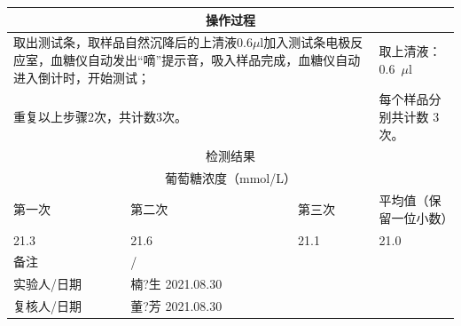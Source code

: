 \documentclass[UTF8,10pt,a4paper,fontset=fandol]{ctexart}
\newcommand{\fieldvalue}[1]{#1}
\newcommand{\handwritten}[1]{#1}
\begin{document}
\begin{enumerate}
\begin{center}
\begin{tabular}{|p{}|p{}|p{}|p{}|}
\hline
\multicolumn{4}{|c|}{操作过程} \\
\hline
\multicolumn{3}{|p{0.69\textwidth}|}{取出测试条，取样品自然沉降后的上清液0.6$\mu$l加入测试条电极反应室，血糖仪自动发出“嘀”提示音，吸入样品完成，血糖仪自动进入倒计时，开始测试；} &
取上清液：
\fieldvalue{\handwritten{0.6}}~$\mu$l \\
\hline
\multicolumn{3}{|p{0.69\textwidth}|}{重复以上步骤2次，共计数3次。} &
每个样品分别共计数
\fieldvalue{\handwritten{3}} 次。 \\
\hline
\multicolumn{4}{|c|}{检测结果} \\
\hline
\multicolumn{4}{|c|}{葡萄糖浓度（mmol/L）} \\
\hline
第一次 & 第二次 & 第三次 & 平均值（保留一位小数） \\
\hline
\fieldvalue{\handwritten{21.3}} &
\fieldvalue{\handwritten{21.6}} &
\fieldvalue{\handwritten{21.1}} &
\fieldvalue{\handwritten{21.0}} \\
\hline
\multicolumn{1}{|l|}{备注} &
\fieldvalue{\handwritten{/}} & \multicolumn{2}{l|}{} \\
\hline
\multicolumn{1}{|l|}{实验人/日期} &
\fieldvalue{\handwritten{楠?生}}\quad
\fieldvalue{\handwritten{2021.08.30}} &
\multicolumn{2}{l|}{} \\
\hline
\multicolumn{1}{|l|}{复核人/日期} &
\fieldvalue{\handwritten{董?芳}}\quad
\fieldvalue{\handwritten{2021.08.30}} &
\multicolumn{2}{l|}{} \\
\hline
\end{tabular}
\end{center}
\end{enumerate}
\end{document}
